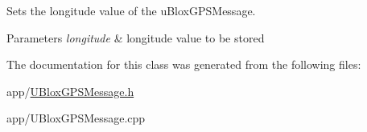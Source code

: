 Sets the longitude value of the u\+Blox\+G\+P\+S\+Message. 


\begin{DoxyParams}{Parameters}
{\em longitude} & longitude value to be stored \\
\hline
\end{DoxyParams}


The documentation for this class was generated from the following files\+:\begin{DoxyCompactItemize}
\item 
app/\hyperlink{_u_blox_g_p_s_message_8h}{U\+Blox\+G\+P\+S\+Message.\+h}\item 
app/U\+Blox\+G\+P\+S\+Message.\+cpp\end{DoxyCompactItemize}
